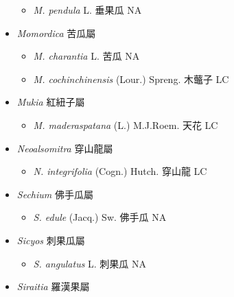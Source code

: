\begin{itemize}
  \begin{itemize}
        \item[] \textit{M. pendula} L.  垂果瓜   NA
  \end{itemize}
 \item[] \textit{Momordica} 苦瓜屬
                                
  \begin{itemize}
        \item[] \textit{M. charantia} L.  苦瓜   NA
        \item[] \textit{M. cochinchinensis} (Lour.) Spreng.  木虌子   LC
  \end{itemize}
 \item[] \textit{Mukia} 紅紐子屬
                                
  \begin{itemize}
        \item[] \textit{M. maderaspatana} (L.) M.J.Roem.  天花   LC
  \end{itemize}
 \item[] \textit{Neoalsomitra} 穿山龍屬
                                
  \begin{itemize}
        \item[] \textit{N. integrifolia} (Cogn.) Hutch.  穿山龍   LC
  \end{itemize}
 \item[] \textit{Sechium} 佛手瓜屬
                                
  \begin{itemize}
        \item[] \textit{S. edule} (Jacq.) Sw.  佛手瓜   NA
  \end{itemize}
 \item[] \textit{Sicyos} 刺果瓜屬
                                
  \begin{itemize}
        \item[] \textit{S. angulatus} L.  刺果瓜   NA
  \end{itemize}
 \item[] \textit{Siraitia} 羅漢果屬
                                

\end{itemize}
